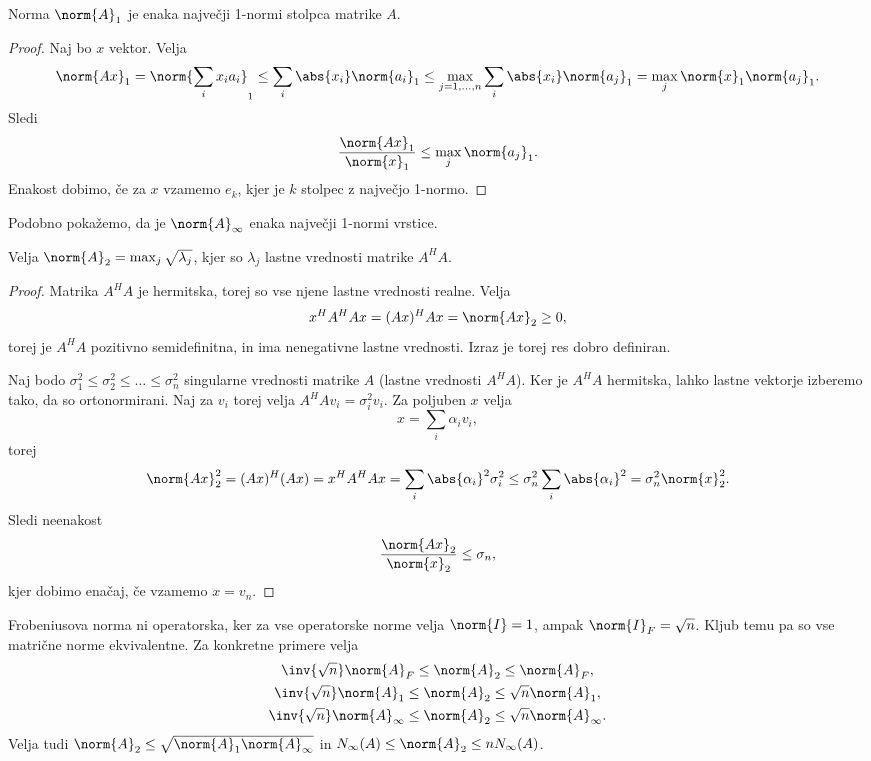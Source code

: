 
\begin{lema}
  Norma $\norm{A}_1$ je enaka največji 1-normi stolpca matrike $A$.
\end{lema}

\begin{proof}
  Naj bo $x$ vektor.
  Velja
  \[
	\norm{Ax}_1
	= \norm{\sum_i x_i a_i}_1
	\le \sum_i \abs{x_i} \norm{a_i}_1
	\le \max_{j=1, \ldots, n} \sum_i \abs{x_i} \norm{a_j}_1
	= \max_j \norm{x}_1 \norm{a_j}_1.
  \]
  Sledi
  \[
	\frac{\norm{Ax}_1}{\norm{x}_1} \le \max_j \norm{a_j}_1.
  \]
  Enakost dobimo, če za $x$ vzamemo $e_k$, kjer je $k$ stolpec z največjo
  1-normo.
\end{proof}

Podobno pokažemo, da je $\norm{A}_\infty$ enaka največji 1-normi vrstice.


\begin{lema}
  Velja $\norm{A}_2 = \max_j \sqrt{\lambda_j}$, kjer so $\lambda_j$ lastne
  vrednosti matrike $A^H A$.
\end{lema}

\begin{proof}
  Matrika $A^H A$ je hermitska, torej so vse njene lastne vrednosti realne.
  Velja
  \[
	x^H A^H A x = (Ax)^H Ax = \norm{Ax}_2 \ge 0,
  \]
  torej je $A^H A$ pozitivno semidefinitna, in ima nenegativne lastne vrednosti.
  Izraz je torej res dobro definiran.

  Naj bodo $\sigma_1^2 \le \sigma_2^2 \le \ldots \le \sigma_n^2$ singularne
  vrednosti matrike $A$ (lastne vrednosti $A^H A$).
  Ker je $A^H A$ hermitska, lahko lastne vektorje izberemo tako, da so
  ortonormirani.
  Naj za $v_i$ torej velja $A^H A v_i = \sigma_i^2 v_i$.
  Za poljuben $x$ velja
  \[
	x = \sum_i \alpha_i v_i,
  \]
  torej
  \[
	\norm{Ax}_2^2
	= (Ax)^H (Ax)
	= x^H A^H A x
	= \sum_i \abs{\alpha_i}^2 \sigma_i^2
	\le \sigma_n^2 \sum_i \abs{\alpha_i}^2
	= \sigma_n^2 \norm{x}_2^2.
  \]
  Sledi neenakost
  \[
	\frac{\norm{Ax}_2}{\norm{x}_2} \le \sigma_n,
  \]
  kjer dobimo enačaj, če vzamemo $x = v_n$.
\end{proof}


Frobeniusova norma ni operatorska, ker za vse operatorske norme velja $\norm{I}
= 1$, ampak $\norm{I}_F = \sqrt{n}$.
Kljub temu pa so vse matrične norme ekvivalentne.
Za konkretne primere velja
\begin{gather*}
  \inv{\sqrt{n}} \norm{A}_F \le \norm{A}_2 \le \norm{A}_F, \\
  \inv{\sqrt{n}} \norm{A}_1 \le \norm{A}_2 \le \sqrt{n} \norm{A}_1, \\
  \inv{\sqrt{n}} \norm{A}_\infty \le \norm{A}_2 \le \sqrt{n} \norm{A}_\infty.
\end{gather*}
Velja tudi $\norm{A}_2 \le \sqrt{\norm{A}_1 \norm{A}_\infty}$ in $N_\infty(A)
\le \norm{A}_2 \le n N_\infty(A)$.

